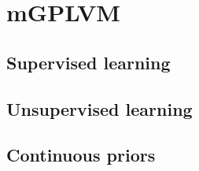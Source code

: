 
\section{mGPLVM}


\subsection{Supervised learning}

\subsection{Unsupervised learning}

\subsection{Continuous priors}
